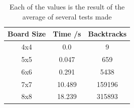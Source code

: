 \documentclass{llncs}
\begin{document}
\begin{table}[h]
\centering
\caption{Each of the values is the result of the average of several tests made}
\label{Results Tablel}
\begin{tabular}{@{}ccc@{}}
\toprule
\multicolumn{1}{c|}{\textbf{Board Size}} & \multicolumn{1}{c|}{\textbf{Time /s}} & \textbf{Backtracks} \\ \midrule
4x4                                      & 0.0                                 & 9                   \\ \midrule
5x5                                      & 0.047                                 & 659                 \\ \midrule
6x6                                      & 0.291                                 & 5438                \\ \midrule
7x7                                      & 10.489                                & 159196              \\ \midrule
8x8                                      & 18.239                                & 315893              \\ \bottomrule
\end{tabular}
\end{table}
\end{document}
